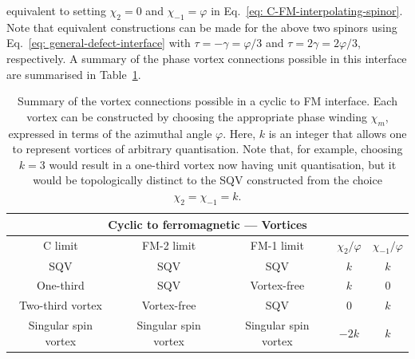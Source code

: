 equivalent to setting \(\chi_2 = 0\) and \(\chi_{-1}=\varphi \) in
Eq.~\eqref{eq: C-FM-interpolating-spinor}.
Note that equivalent constructions can be made for the above two spinors using
Eq.~\eqref{eq: general-defect-interface} with \(\tau=-\gamma=\varphi/3\) and
\(\tau=2\gamma=2\varphi/3\), respectively.
A summary of the phase vortex connections possible in this interface are
summarised in Table~\ref{tab: C-FM-vortices}.
\begin{table}
    \centering
    \begin{tabular}{ccccc}
        \toprule
        \multicolumn{5}{c}{Cyclic to ferromagnetic --- Vortices} \\
        \midrule
        C limit & FM-2 limit & FM-1 limit & \(\chi_2/\varphi \)
        & \(\chi_{-1}/\varphi \) \\
        \midrule
         SQV & SQV & SQV & \(k\) & \(k\) \\ 
         One-third & SQV & Vortex-free & \(k\) & 0 \\
         Two-third vortex & Vortex-free & SQV & 0 & \(k\) \\
         Singular spin vortex & Singular spin vortex & Singular spin vortex
         & \(-2k\) & \(k\) \\
        \bottomrule
    \end{tabular}
    \caption{\label{tab: C-FM-vortices}Summary of the vortex connections
    possible in a cyclic to FM interface.
    Each vortex can be constructed by choosing the appropriate phase winding
    \(\chi_m\), expressed in terms of the azimuthal angle \(\varphi \).
    Here, \(k \) is an integer that allows one to represent vortices of
    arbitrary quantisation.
    Note that, for example, choosing \(k=3\) would result in a one-third
    vortex now having unit quantisation, but it would be topologically distinct
    to the SQV constructed from the choice \(\chi_2=\chi_{-1}=k\).}
\end{table}

